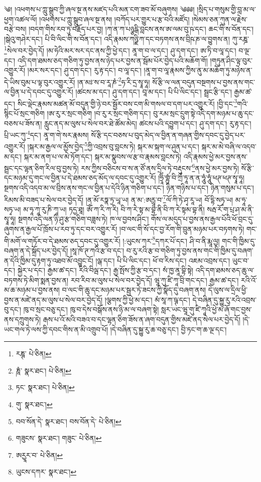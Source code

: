 \setcounter{footnote}{0} 
༄། །འཕགས་པ་ཀླུ་སྒྲུབ་ཀྱི་ཞལ་སྔ་ནས་མཛད་པའི་མན་ངག་ཟབ་མོ་བཞུགས། ༄༅༅། །སྲིད་པ་གསུམ་གྱི་བླ་མ་ལ་ཕྱག་འཚལ་ལོ། །འཕགས་པ་ཀླུ་སྒྲུབ་ཞལ་སྔ་ནས། །བཀོད་པར་གྱུར་པ་རྩ་བའི་མཛོད། །སེམས་ཅན་ཀུན་ལ་རྗེས་བརྩེ་བས། །བདག་གིས་རབ་ཏུ་བརྗོད་པར་བྱ། །ཀ་ན་ཀ་པཉྩདྒི་བླངས་ནས་ཨ་ལམ་བུ་ཥ་དང་། ཆང་གི་ས་བོན་དང་། །སྒེའུ་གཤེར་དང་། པི་བི་ལིང་གི་ས་བོན་དང་། འདི་རྣམས་ཀཉྫི་ཀ་དང་བཏགས་ནས་བྲིཥ་ཎ་ལ་བྱུགས་ན། ཀུ་རཎྜ་\footnote{རཎྚ་  པེ་ཅིན། }སེལ་བར་བྱེད་དོ། །མ་ཧེའི་མར་སར་དང་ནས་ཀྱི་ཕྱེ་དང་། ནཱ་ག་བ་ལ་དང་། ཤུ་དག་དང་། ཨ་ཏི་བ་ལཱ་དང་། བ་ལྔ་དང་། འདི་དག་ཐམས་ཅད་གཅིག་ཏུ་བྱས་ནས་ཉེད་པར་བྱས་ན་སྦོམ་པོར་བྱེད་པའི་མཆོག་གོ། །གཏུན་ཤིང་ལྟ་བུར་འགྱུར་རོ། །མར་སར་དང་། ཤུ་དག་དང་། རུ་རྟ་དང་། བ་ལཱ་དང་། །ནཱ་ག་བ་ལཱ་རྣམས་ཀྱིས་ནུ་མ་མཆོག་ཏུ་མཉེས་ན་དེ་ཡིས་བུམ་པ་ལྟ་བུར་འགྱུར་རོ། །ན་མཿ་ས་བ་རཱ་ཎཾ་\footnote{ཎཱཾ་  སྣར་ཐང་།  པེ་ཅིན། }ཧ་རི་དྲ་སྭཱ་ཧཱ། སོ་རྩི་ལ་ལན་བདུན་བསྔགས་པ་བྱས་ནས་གང་ལ་བྱིན་པ་དེ་དབང་དུ་འགྱུར་རོ། །ཚངས་མ་དང་། ཤུ་དག་དང་། བཱ་མ་དང་། པི་པི་ལིང་དང་། སྦྲང་རྩི་དང་། རྒྱམ་ཚ་དང་། སིང་ལྡེང་རྣམས་མཚན་མོ་བདུན་གྱི་ཉེ་བར་སྦྱོར་བས་ངག་མི་གསལ་བ་དག་པར་འགྱུར་རོ། །བྱི་དང་\footnote{ཏང་  སྣར་ཐང་།  པེ་ཅིན། }གའི་སྙིང་པོ་སྲང་གཅིག །ཨ་རུ་ར་སྲང་གཅིག །བ་རུ་ར་སྲང་གཅིག་དང་། བུ་རམ་སྲང་དྲུག་སྟེ་འདི་དག་མཉམ་པ་ཆུ་དང་བཅས་པ་ཟོས་ན། རླུང་ནད་མ་ལུས་པ་སེལ་བར་ཐེ་ཚོམ་མེད། ཚངས་པའི་དབྱུག་པ་དང་། ཤུ་དག་དང་། རུ་རྟ་དང་། པྲི་ཡང་ཀུ་\footnote{གུ་  སྣར་ཐང་། }དང་། ནཱ་ག་གེ་སར་རྣམས། སོ་རྩི་དང་བཅས་པ་བུད་མེད་ལ་བྱིན་ན་གཞན་གྱིས་དབང་དུ་བྱེད་པར་འགྱུར་རོ། །སྐར་མ་རྒྱལ་ལ་མྱོས་བྱེད་\footnote{བབ་སོན་ེད་  སྣར་ཐང་། བས་བོན་ེད་  པེ་ཅིན། }ཀྱི་འབྲས་བུ་བླངས་ཏེ། སྐར་མ་སྐག་ལ་ཤུན་པ་དང་། སྐར་མ་མེ་བཞི་ལ་འདབ་མ་དང་། སྐར་མ་ནག་པ་ལ་མེ་ཏོག་དང་། སྐར་མ་སྣུབས་ལ་རྩ་བ་རྣམས་བླངས་ཏེ། འདི་རྣམས་ཕྱེ་མར་བྱས་ནས་སྦྲང་དང་ལྷན་ཅིག་རིལ་བུ་བྱས་ཏེ། རས་ཀྱིས་བཅིངས་བ་ས་ན་ཙོ་ནས་དྲིལ་ཏེ་བརྡུངས་\footnote{གཟུངས་  སྣར་ཐང་། གཟུང་  པེ་ཅིན། }ནས་ཕྱེ་མར་བྱས་ཏེ། སོ་རྩི་དང་མཉམ་དུ་གང་ལ་བྱིན་པ་དེ་ཐམས་ཅད་མོད་ལ་དབང་དུ་འགྱུར་རོ། །ཧྲཱིཾ་གྷུཾ་བི་ཀྲྀ་ཏཱ་ན་ན་ཧཱུཾ་ཧཱུཾ་ཕཊ་ཕཊ་སྭཱ་ཧཱ། སྔགས་འདི་འདབ་མ་ལ་བྲིས་ནས་གང་ལ་བྱིན་པ་དེའི་ཉིན་གཅིག་པ་དང་། ཉིན་གཉིས་པ་དང་། ཉིན་གསུམ་པ་དང་། རིམས་མི་བཟད་པ་སེལ་བར་བྱེད་དོ། །ན་མོ་རཏྣ་ཏྲ་ཡཱ་ཡ། ན་མ་:ཨརྻཱ་བ་\footnote{ཨརྱཱར་བ་  པེ་ཅིན། }ལོ་ཀི་ཏེ་ཤྭ་རཱ་ཡ། བོ་དྷི་སཏྭ་ཡ། མ་ཧཱ་སཏྭ་ཡ། མ་ཧཱ་ཀཱ་རུ་ཎི་ཀཱ་ཡ། ཏདྱ་ཐཱ། ཨོཾ་ཀ་རི་ཀ་རི། བི་ཀ་རེ་སྟ་མ་བྷ་ནི་བི་ཀ་རེ་སྟམ་བྷ་ནི། སརྦ་རོ་ག་པྲ་ཤ་མ་ནི་སྭཱ་ཧཱ། སྔགས་འདི་ལན་ཉི་ཤུ་རྩ་གཅིག་བཟླས་ཏེ། ཁ་ལ་བྱབས་ཤིང་། གོས་ལ་མདུད་པ་བྱས་ནས་རྒྱལ་པོའི་ཕོ་བྲང་དུ་ཞུགས་ན་རྒྱལ་པོ་ཁྲོས་པ་རབ་ཏུ་དང་བར་འགྱུར་རོ། །བ་ལང་གི་སོ་དང་བྱ་རོག་གི་བྲུན་མཉམ་པར་བཏགས་ཏེ། གང་གི་མགོ་ལ་གཏོར་བ་དེ་ཐམས་ཅད་དབང་དུ་འགྱུར་རོ། །:ཡུངས་ཀར་\footnote{ཡུངས་དཀར་  སྣར་ཐང་། }དཀར་པོ་དང་། ཤི་བ་ནི་རྨཱ་ལྱ། གང་གི་ཁྱིམ་དུ་བཞག་ན་དེ་སྐྲོད་པར་བྱེད་དོ། །སཱ་ཁོ་ཊ་ཀའི་རྩ་བ་དང་། བ་རུ་རའི་རྩ་བ་གཅིག་ཏུ་བྱས་ནས་གང་གི་ཁྱིམ་དུ་བཞག་ན་དེའི་ཁྱིམ་དུ་རྟག་ཏུ་འཐབ་མོ་འབྱུང་ངོ། །ལྒ་དང་། པི་པི་ལིང་དང་། ཕོ་བ་རིས་དང་། འཇམ་འབྲས་དང་། ཡུང་བ་དང་། སྐྱེར་པ་དང་། རྒྱམ་ཚ་དང་། རིའི་བིལྦ་དང་། རྒྱ་སྤོས་ཀྱི་རྩ་བ་དང་། སཾ་ཁྱ་ནཱ་བྷི་སྟེ། འདི་དག་ཐམས་ཅད་ཆུ་ལ་བཏགས་ཏེ་མིག་སྨན་བྱས་ན། རབ་རིབ་མ་ལུས་པ་སེལ་བར་བྱེད་དོ། ཝཱ་ཀུ་ཛི་ཀཱ་བྲི་གང་དང་། རྒྱམ་ཚ་དང་། རའི་འོ་མ་ཆ་མཉམ་པ་བྱས་ནས། བ་ལང་གི་ཆུ་དང་མཉམ་པར་སྦྱར་ཏེ་ཟངས་ཀྱི་སྣོད་དུ་བཞག་ནས། དེ་ལུས་ལ་དྲིལ་ཕྱི་བྱས་ན་མཛེ་ནད་མ་ལུས་པ་སེལ་བར་བྱེད་དོ། །ལྕགས་ཀྱི་ཕྱེ་མ་དང་། མཾ་སཱ་ཀ་ཥྚ་དང་། དེ་བཞིན་དུ་སྐྱུ་རུ་རའི་འབྲས་བུ་དང་། ཁུ་བ་སྲང་བཅུ་དང་། ཁུ་བ་དེས་བསྒོས་ནས་ཉི་མ་ལ་བཞག་སྟེ། སླར་ཡང་ཝཱ་གུ་ཛི་ཀཱའི་ཕྱེ་མ་ཞོ་གང་བྱས་ནས་དཀྲུགས་ཏེ། རྒས་པ་འོ་མའི་བཟའ་བ་དང་ལྷན་ཅིག་ཟོས་ན་ཞག་བདུན་གྱིས་མཛེ་ནད་སེལ་པར་བྱེད་དོ། །དེ་ཡང་གལ་ཏེ་ལས་ཀྱི་དབང་གིས་ན་མི་འགྲུབ་པོ། །དེ་བཞིན་དུ་སྐྱུ་རུ་ཆ་བཅུ་དང་། བྱི་ཏང་ག་ཆ་ལྔ་དང་། 